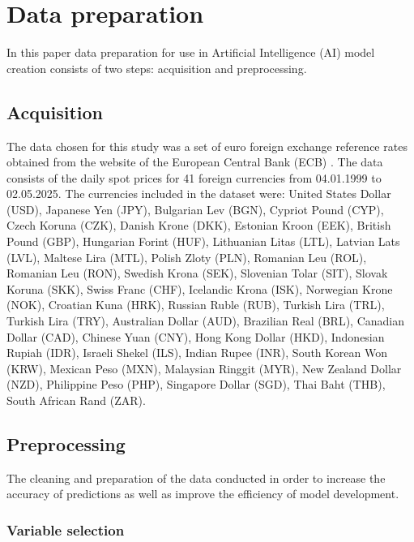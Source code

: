 \section{Data preparation}\label{Data preparation}

In this paper data preparation for use in Artificial Intelligence (AI) model creation consists of two steps: acquisition and preprocessing.

\subsection{Acquisition}\label{Acquisition}

The data chosen for this study was a set of euro foreign exchange reference rates obtained from the website of the European Central Bank (ECB) \cite{forex-data}. The data consists of the daily spot prices for 41 foreign currencies from 04.01.1999 to 02.05.2025. The currencies included in the dataset were: United States Dollar (USD), Japanese Yen (JPY), Bulgarian Lev (BGN), Cypriot Pound (CYP), Czech Koruna (CZK), Danish Krone (DKK), Estonian Kroon (EEK), British Pound (GBP), Hungarian Forint (HUF), Lithuanian Litas (LTL), Latvian Lats (LVL), Maltese Lira (MTL), Polish Zloty (PLN), Romanian Leu (ROL), Romanian Leu (RON), Swedish Krona (SEK), Slovenian Tolar (SIT), Slovak Koruna (SKK), Swiss Franc (CHF), Icelandic Krona (ISK), Norwegian Krone (NOK), Croatian Kuna (HRK), Russian Ruble (RUB), Turkish Lira (TRL), Turkish Lira (TRY), Australian Dollar (AUD), Brazilian Real (BRL), Canadian Dollar (CAD), Chinese Yuan (CNY), Hong Kong Dollar (HKD), Indonesian Rupiah (IDR), Israeli Shekel (ILS), Indian Rupee (INR), South Korean Won (KRW), Mexican Peso (MXN), Malaysian Ringgit (MYR), New Zealand Dollar (NZD), Philippine Peso (PHP), Singapore Dollar (SGD), Thai Baht (THB), South African Rand (ZAR).

\subsection{Preprocessing}\label{Preprocessing}

The cleaning and preparation of the data conducted in order to increase the accuracy of predictions as well as improve the efficiency of model development.

\subsubsection{Variable selection}\label{Variable selection}

